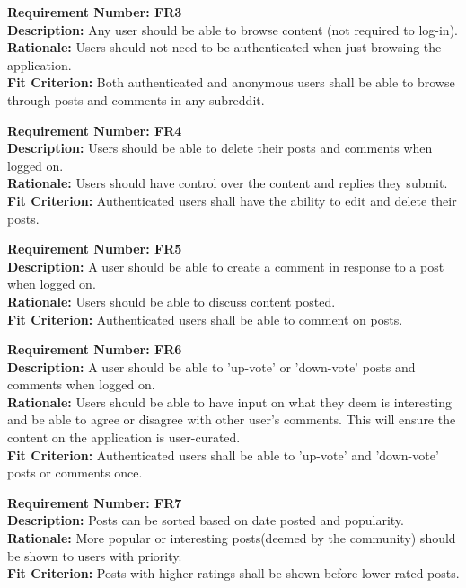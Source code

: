 \documentclass[12pt,fleqn]{article}
\begin{document}
\begin{tcolorbox}
\textbf{Requirement Number: FR3} \\
\textbf{Description:} Any user should be able to browse content (not required to log-in). \\
\textbf{Rationale:} Users should not need to be authenticated when just browsing the application.\\
\textbf{Fit Criterion:} Both authenticated and anonymous users shall be able to browse through posts and comments in any subreddit.
\end{tcolorbox}

\begin{tcolorbox}
\textbf{Requirement Number: FR4} \\
\textbf{Description:} Users should be able to delete their posts and comments when logged on. \\
\textbf{Rationale:} Users should have control over the content and replies they submit. \\
\textbf{Fit Criterion:} Authenticated users shall have the ability to edit and delete their posts.
\end{tcolorbox}

\begin{tcolorbox}
\textbf{Requirement Number: FR5} \\
\textbf{Description:} A user should be able to create a comment in response to a post when logged on. \\
\textbf{Rationale:} Users should be able to discuss content posted. \\
\textbf{Fit Criterion:} Authenticated users shall be able to comment on posts.
\end{tcolorbox}

\begin{tcolorbox}
\textbf{Requirement Number: FR6} \\
\textbf{Description:} A user should be able to 'up-vote' or 'down-vote' posts and comments when logged on. \\
\textbf{Rationale:} Users should be able to have input on what they deem is interesting and be able to agree or disagree with other user's comments.  This will ensure the content on the application is user-curated. \\
\textbf{Fit Criterion:} Authenticated users shall be able to 'up-vote' and 'down-vote' posts or comments once.
\end{tcolorbox}

\begin{tcolorbox}
\textbf{Requirement Number: FR7} \\
\textbf{Description:} Posts can be sorted based on date posted and popularity.\\
\textbf{Rationale:} More popular or interesting posts(deemed by the community) should be shown to users with priority. \\
\textbf{Fit Criterion:} Posts with higher ratings shall be shown before lower rated posts.
\end{tcolorbox}
\end{document}
